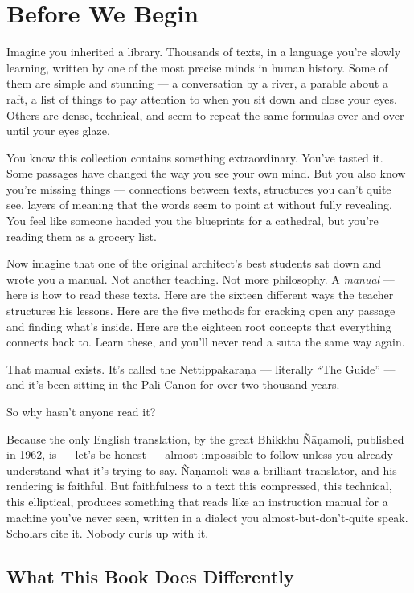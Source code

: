 \chapter{Before We Begin}

Imagine you inherited a library. Thousands of texts, in a language you're slowly learning, written by one of the most precise minds in human history. Some of them are simple and stunning --- a conversation by a river, a parable about a raft, a list of things to pay attention to when you sit down and close your eyes. Others are dense, technical, and seem to repeat the same formulas over and over until your eyes glaze.

You know this collection contains something extraordinary. You've tasted it. Some passages have changed the way you see your own mind. But you also know you're missing things --- connections between texts, structures you can't quite see, layers of meaning that the words seem to point at without fully revealing. You feel like someone handed you the blueprints for a cathedral, but you're reading them as a grocery list.

Now imagine that one of the original architect's best students sat down and wrote you a manual. Not another teaching. Not more philosophy. A \textit{manual} --- here is how to read these texts. Here are the sixteen different ways the teacher structures his lessons. Here are the five methods for cracking open any passage and finding what's inside. Here are the eighteen root concepts that everything connects back to. Learn these, and you'll never read a sutta the same way again.

That manual exists. It's called the Nettippakaraṇa --- literally ``The Guide'' --- and it's been sitting in the Pali Canon for over two thousand years.

So why hasn't anyone read it?

Because the only English translation, by the great Bhikkhu Ñāṇamoli, published in 1962, is --- let's be honest --- almost impossible to follow unless you already understand what it's trying to say. Ñāṇamoli was a brilliant translator, and his rendering is faithful. But faithfulness to a text this compressed, this technical, this elliptical, produces something that reads like an instruction manual for a machine you've never seen, written in a dialect you almost-but-don't-quite speak. Scholars cite it. Nobody curls up with it.

\section*{What This Book Does Differently}

